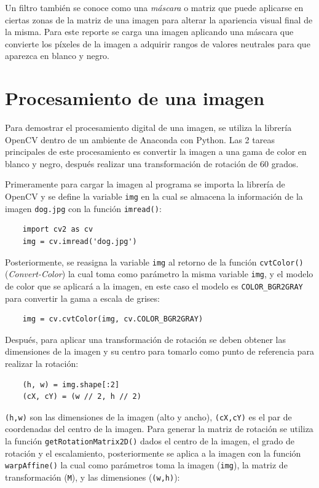 \documentclass[a4paper, 12pt]{article}
\begin{document}
Un filtro también se conoce como una \emph{máscara} o matriz que puede aplicarse en ciertas zonas de la matriz de una imagen para alterar la apariencia visual final de la misma. Para este reporte se carga una imagen aplicando una máscara que convierte los píxeles de la imagen a adquirir rangos de valores neutrales para que aparezca en blanco y negro.

\section{Procesamiento de una imagen}
Para demostrar el procesamiento digital de una imagen, se utiliza la librería OpenCV dentro de un ambiente de Anaconda con Python. Las 2 tareas principales de este procesamiento es convertir la imagen a una gama de color en blanco y negro, después realizar una transformación de rotación de 60 grados.

Primeramente para cargar la imagen al programa se importa la librería de OpenCV y se define la variable \lstinline{img} en la cual se almacena la información de la imagen \lstinline{dog.jpg} con la función \lstinline{imread()}:

\begin{lstlisting}
    import cv2 as cv
    img = cv.imread('dog.jpg')
\end{lstlisting}

Posteriormente, se reasigna la variable \lstinline{img} al retorno de la función \lstinline{cvtColor()} (\emph{Convert-Color}) la cual toma como parámetro la misma variable \lstinline{img}, y el modelo de color que se aplicará a la imagen, en este caso el modelo es \lstinline{COLOR_BGR2GRAY} para convertir la gama a escala de grises:

\begin{lstlisting}
    img = cv.cvtColor(img, cv.COLOR_BGR2GRAY)
\end{lstlisting}

Después, para aplicar una transformación de rotación se deben obtener las dimensiones de la imagen y su centro para tomarlo como punto de referencia para realizar la rotación:

\begin{lstlisting}
    (h, w) = img.shape[:2]
    (cX, cY) = (w // 2, h // 2)
\end{lstlisting}

\lstinline{(h,w)} son las dimensiones de la imagen (alto y ancho), \lstinline{(cX,cY)} es el par de coordenadas del centro de la imagen. Para generar la matriz de rotación se utiliza la función \lstinline{getRotationMatrix2D()} dados el centro de la imagen, el grado de rotación y el escalamiento, posteriormente se aplica a la imagen con la función \lstinline{warpAffine()} la cual como parámetros toma la imagen (\lstinline{img}), la matriz de transformación (\lstinline{M}), y las dimensiones (\lstinline{(w,h)}):
\end{document}
